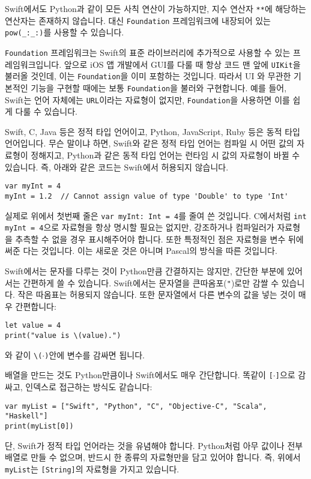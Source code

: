 \documentclass[../main.tex]{subfiles}
\begin{document}
Swift에서도 Python과 같이 모든 사칙 연산이 가능하지만, 지수 연산자
\texttt{**}에 해당하는 연산자는 존재하지 않습니다.
대신 \texttt{Foundation} 프레임워크에 내장되어 있는 \texttt{pow(\_:\_:)}를
사용할 수 있습니다.

\texttt{Foundation} 프레임워크는 Swift의 표준 라이브러리에 추가적으로 사용할 수
있는 프레임워크입니다.
앞으로 iOS 앱 개발에서 GUI를 다룰 때 항상 코드 맨 앞에 \texttt{UIKit}을 불러올 
것인데, 이는 \texttt{Foundation}을 이미 포함하는 것입니다.
따라서 UI 와 무관한 기본적인 기능을 구현할 때에는 보통 \texttt{Foundation}을
불러와 구현합니다.
예를 들어, Swift는 언어 자체에는 \texttt{URL}이라는 자료형이 없지만,
\texttt{Foundation}을 사용하면 이를 쉽게 다룰 수 있습니다.

Swift, C, Java 등은 정적 타입 언어이고, Python, JavaScript, Ruby 등은 동적 타입
언어입니다.
무슨 말이냐 하면, Swift와 같은 정적 타입 언어는 컴파일 시 어떤 값의 자료형이
정해지고, Python과 같은 동적 타입 언어는 런타임 시 값의 자료형이 바뀔 수
있습니다.
즉, 아래와 같은 코드는 Swift에서 허용되지 않습니다.
\begin{verbatim}
var myInt = 4
myInt = 1.2  // Cannot assign value of type 'Double' to type 'Int'
\end{verbatim}
실제로 위에서 첫번째 줄은 \texttt{var myInt: Int = 4}를 줄여 쓴 것입니다.
C에서처럼 \texttt{int myInt = 4}으로 자료형을 항상 명시할 필요는 없지만,
강조하거나 컴파일러가 자료형을 추측할 수 없을 경우 표시해주어야 합니다.
또한 특정적인 점은 자료형을 변수 뒤에 써준 다는 것입니다.
이는 새로운 것은 아니며 Pascal의 방식을 따른 것입니다.

Swift에서는 문자를 다루는 것이 Python만큼 간결하지는 않지만, 간단한 부분에
있어서는 간편하게 쓸 수 있습니다.
Swift에서는 문자열을 큰따옴포(\texttt{"})로만 감쌀 수 있습니다.
작은 따옴표는 허용되지 않습니다.
또한 문자열에서 다른 변수의 값을 넣는 것이 매우 간편합니다:
\begin{verbatim}
let value = 4
print("value is \(value).")
\end{verbatim}
와 같이 \texttt{\textbackslash($\cdot$)}안에 변수를 감싸면 됩니다.

배열을 만드는 것도 Python만큼이나 Swift에서도 매우 간단합니다.
똑같이 \texttt{[$\cdot$]}으로 감싸고, 인덱스로 접근하는 방식도 같습니다:
\begin{verbatim}
var myList = ["Swift", "Python", "C", "Objective-C", "Scala", "Haskell"]
print(myList[0])
\end{verbatim}
단, Swift가 정적 타입 언어라는 것을 유념해야 합니다.
Python처럼 아무 값이나 전부 배열로 만들 수 없으며, 반드시 한 종류의 자료형만을
담고 있어야 합니다.
즉, 위에서 \texttt{myList}는 \texttt{[String]}의 자료형을 가지고 있습니다.
\end{document}

